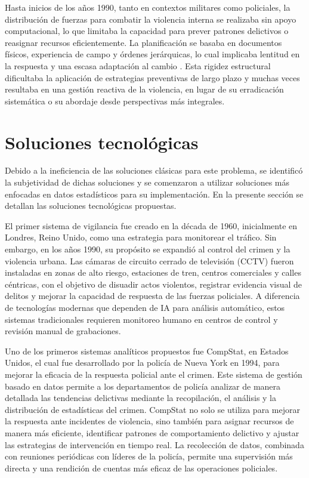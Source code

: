 Hasta inicios de los años 1990, tanto en contextos militares 
como policiales, la distribución de fuerzas para combatir la 
violencia interna se realizaba sin apoyo computacional, lo 
que limitaba la capacidad para prever patrones delictivos 
o reasignar recursos eficientemente. La planificación se 
basaba en documentos físicos, experiencia de campo y 
órdenes jerárquicas, lo cual implicaba lentitud en la 
respuesta y una escasa adaptación al cambio \cite{sheptycki1998}. 
Esta rigidez estructural dificultaba la aplicación de 
estrategias preventivas de largo plazo y muchas veces 
resultaba en una gestión reactiva de la violencia, en lugar 
de su erradicación sistemática o su abordaje desde 
perspectivas más integrales.

\section{Soluciones tecnológicas}\label{solucionesTecnologicas}

Debido a la ineficiencia de las soluciones clásicas para este 
problema, se identificó la subjetividad de dichas soluciones 
y se comenzaron a utilizar soluciones más enfocadas en datos 
estadísticos para su implementación. En la presente sección 
se detallan las soluciones tecnológicas propuestas.

El primer sistema de vigilancia fue creado en la década de 
1960, inicialmente en Londres, Reino Unido, como una 
estrategia para monitorear el tráfico. Sin embargo, en los 
años 1990, su propósito se expandió al control del crimen y 
la violencia urbana. Las cámaras de circuito cerrado de 
televisión (CCTV) fueron instaladas en zonas de alto 
riesgo, estaciones de tren, centros comerciales y calles 
céntricas, con el objetivo de disuadir actos violentos, 
registrar evidencia visual de delitos y mejorar la 
capacidad de respuesta de las fuerzas policiales. A 
diferencia de tecnologías modernas que dependen de IA para 
análisis automático, estos sistemas tradicionales requieren 
monitoreo humano en centros de control y revisión manual de 
grabaciones\cite{Vilalta2019}.

Uno de los primeros sistemas analíticos propuestos fue CompStat, en 
Estados Unidos, el cual fue desarrollado por la policía de 
Nueva York en 1994, para mejorar la eficacia de la 
respuesta policial ante el crimen. Este sistema de gestión 
basado en datos permite a los departamentos de policía 
analizar de manera detallada las tendencias delictivas 
mediante la recopilación, el análisis y la distribución de 
estadísticas del crimen. CompStat no solo se utiliza para 
mejorar la respuesta ante incidentes de violencia, sino 
también para asignar recursos de manera más eficiente, 
identificar patrones de comportamiento delictivo y ajustar 
las estrategias de intervención en tiempo real. La 
recolección de datos, combinada con reuniones periódicas 
con líderes de la policía, permite una supervisión más 
directa y una rendición de cuentas más eficaz de las 
operaciones policiales\cite{perf2003compstat}. 

